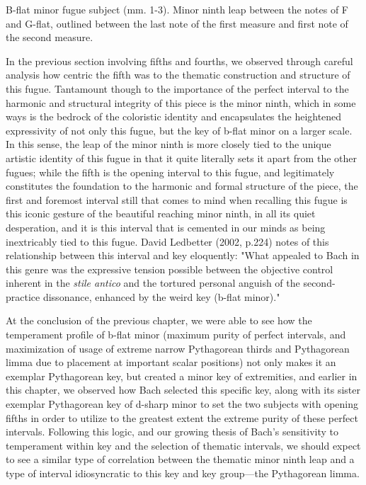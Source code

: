\begin{Example}[H]
\vspace{1.5em}
    \centering
    \caption[Minor ninth in the B-flat minor fugue subject (mm. 1-3). ]{ B-flat minor fugue subject (mm. 1-3). Minor ninth leap between the notes of F and G-flat, outlined between the last note of the first measure and first note of the second measure.}
\end{Example}    
    In the previous section involving fifths and fourths, we observed
through careful analysis how centric the fifth was to the thematic
construction and structure of this fugue. Tantamount though to the
importance of the perfect interval to the harmonic and structural
integrity of this piece is the minor ninth, which in some ways is the
bedrock of the coloristic identity and encapsulates the heightened
expressivity of not only this fugue, but the key of b-flat minor on a
larger scale. In this sense, the leap of the minor ninth is more closely
tied to the unique artistic identity of this fugue in that it quite
literally sets it apart from the other fugues; while the fifth is the
opening interval to this fugue, and legitimately constitutes the
foundation to the harmonic and formal structure of the piece, the first
and foremost interval still that comes to mind when recalling this fugue
is this iconic gesture of the beautiful reaching minor ninth, in all its
quiet desperation, and it is this interval that is cemented in our minds
as being inextricably tied to this fugue. David Ledbetter (2002, p.224)
notes of this relationship between this interval and key eloquently:
"What appealed to Bach in this genre was the expressive tension possible
between the objective control inherent in the \emph{stile antico} and
the tortured personal anguish of the second-practice dissonance,
enhanced by the weird key (b-flat minor)."

At the conclusion of the previous chapter, we were able to see how the
temperament profile of b-flat minor (maximum purity of perfect
intervals, and maximization of usage of extreme narrow Pythagorean
thirds and Pythagorean limma due to placement at important scalar
positions) not only makes it an exemplar Pythagorean key, but created a
minor key of extremities, and earlier in this chapter, we observed how
Bach selected this specific key, along with its sister exemplar
Pythagorean key of d-sharp minor to set the two subjects with opening
fifths in order to utilize to the greatest extent the extreme purity of
these perfect intervals. Following this logic, and our growing thesis of
Bach's sensitivity to temperament within key and the selection of
thematic intervals, we should expect to see a similar type of
correlation between the thematic minor ninth leap and a type of interval
idiosyncratic to this key and key group---the Pythagorean limma.


